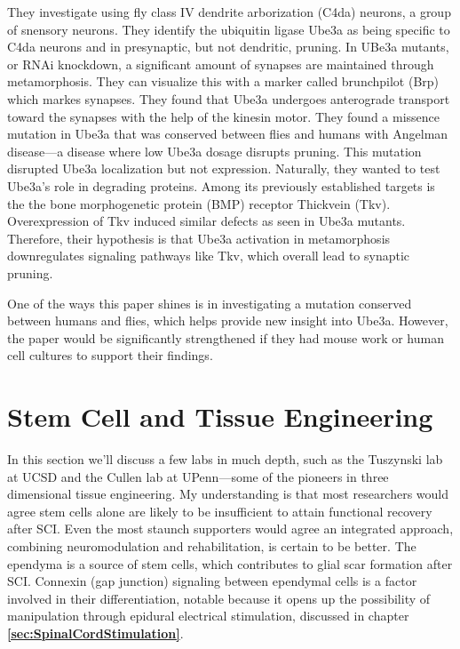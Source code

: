 They investigate using fly class IV dendrite arborization (C4da) neurons, a group of snensory neurons. They identify the ubiquitin ligase Ube3a as being specific to C4da neurons and in presynaptic, but not dendritic, pruning. In UBe3a mutants, or RNAi knockdown, a significant amount of synapses are maintained through metamorphosis. They can visualize this with a marker called brunchpilot (Brp) which markes synapses. They found that Ube3a undergoes anterograde transport toward the synapses with the help of the kinesin motor. They found a missence mutation in Ube3a that was conserved between flies and humans with Angelman disease---a disease where low Ube3a dosage disrupts pruning. This mutation disrupted Ube3a localization but not expression. Naturally, they wanted to test Ube3a's role in degrading proteins. Among its previously established targets is the the bone morphogenetic protein (BMP) receptor Thickvein (Tkv). Overexpression of Tkv induced similar defects as seen in Ube3a mutants. Therefore, their hypothesis is that Ube3a activation in metamorphosis downregulates signaling pathways like Tkv, which overall lead to synaptic pruning.\newline

One of the ways this paper shines is in investigating a mutation conserved between humans and flies, which helps provide new insight into Ube3a. However, the paper would be significantly strengthened if they had mouse work or human cell cultures to support their findings. 






\chapter{Stem Cell and Tissue Engineering}

\label{sec:Stem-Cells}

In this section we'll discuss a few labs in much depth, such as the Tuszynski lab at UCSD and the Cullen lab at UPenn---some of the pioneers in three dimensional tissue engineering. My understanding is that most researchers would agree stem cells alone are likely to be insufficient to attain functional recovery after SCI. Even the most staunch supporters would agree an integrated approach, combining neuromodulation and rehabilitation, is certain to be better. The ependyma is a source of stem cells, which contributes to glial scar formation after SCI. Connexin (gap junction) signaling between ependymal cells is a factor involved in their differentiation, notable because it opens up the possibility of manipulation through epidural electrical stimulation, discussed in chapter \textbf{\ref{sec:SpinalCordStimulation}}.\newline


